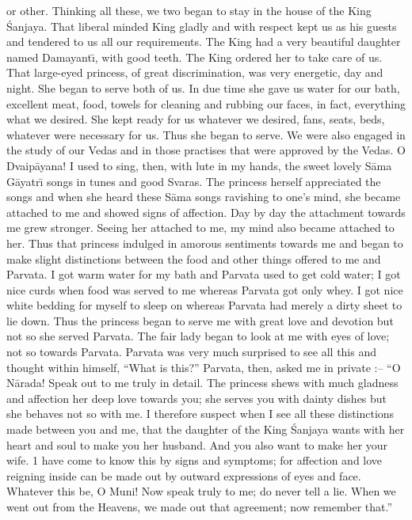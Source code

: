 or other. Thinking all these, we two began to stay in the house of the King \'Sanjaya. That liberal minded King gladly and with respect kept us as his guests and tendered to us all our requirements. The King had a very beautiful daughter named Damayant\={\i}, with good teeth. The King ordered her to take care of us. That large-eyed princess, of great discrimination, was very energetic, day and night. She began to serve both of us. In due time she gave us water for our bath, excellent meat, food, towels for cleaning and rubbing our faces, in fact, everything what we desired. She kept ready for us whatever we desired, fans, seats, beds, whatever were necessary for us. Thus she began to serve. We were also engaged in the study of our Vedas and in those practises that were approved by the Vedas. O Dvaip\=ayana! I used to sing, then, with lute in my hands, the sweet lovely S\=ama G\=ayatr\={\i} songs in tunes and good Svaras. The princess herself appreciated the songs and when she heard these S\=ama songs ravishing to one's mind, she became attached to me and showed signs of affection. Day by day the attachment towards me grew stronger. Seeing her attached to me, my mind also became attached to her. Thus that princess indulged in amorous sentiments towards me and began to make slight distinctions between the food and other things offered to me and Parvata. I got warm water for my bath and Parvata used to get cold water; I got nice curds when food was served to me whereas Parvata got only whey. I got nice white bedding for myself to sleep on whereas Parvata had merely a dirty sheet to lie down. Thus the princess began to serve me with great love and devotion but not so she served Parvata. The fair lady began to look at me with eyes of love; not so towards Parvata. Parvata was very much surprised to see all this and thought within himself, ``What is this?'' Parvata, then, asked me in private :-- ``O N\=arada! Speak out to me truly in detail. The princess shews with much gladness and affection her deep love towards you; she serves you with dainty dishes but she behaves not so with me. I therefore suspect when I see all these distinctions made between you and me, that the daughter of the King \'Sanjaya wants with her heart and soul to make you her husband. And you also want to make her your wife. 1 have come to know this by signs and symptoms; for affection and love reigning inside can be made out by outward expressions of eyes and face. Whatever this be, O Muni! Now speak truly to me; do never tell a lie. When we went out from the Heavens, we made out that agreement; now remember that.''

